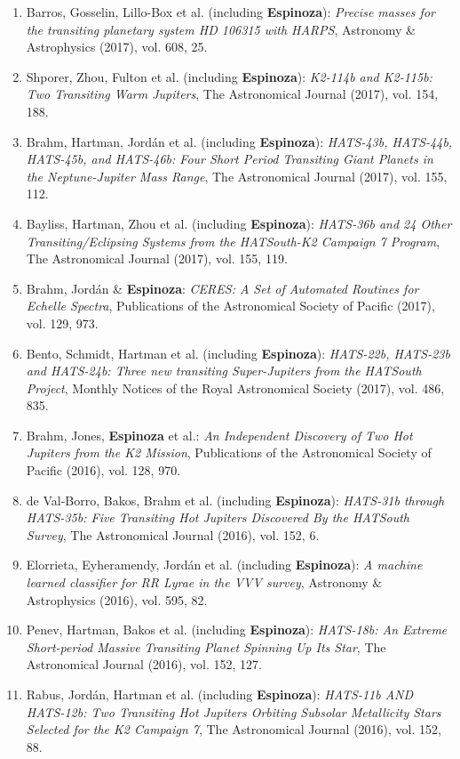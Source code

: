 \documentclass[11pt, a4paper]{article} %
\begin{document}
\begin{flushleft}
\begin{enumerate}
\item Barros, Gosselin, Lillo-Box et al. (including \textbf{Espinoza}): \textit{Precise masses for the transiting planetary system HD 106315 with HARPS}, Astronomy \& Astrophysics (2017), vol. 608, 25.
\item Shporer, Zhou, Fulton et al. (including \textbf{Espinoza}): \textit{K2-114b and K2-115b: Two Transiting Warm Jupiters}, The Astronomical Journal (2017), vol. 154, 188.
\item Brahm, Hartman, Jord\'an et al. (including \textbf{Espinoza}): \textit{HATS-43b, HATS-44b, HATS-45b, and HATS-46b: Four Short Period Transiting Giant Planets in the Neptune-Jupiter Mass Range}, The Astronomical Journal (2017), vol. 155, 112.
\item Bayliss, Hartman, Zhou et al. (including \textbf{Espinoza}): \textit{HATS-36b and 24 Other Transiting/Eclipsing Systems from the HATSouth-K2 Campaign 7 Program}, The Astronomical Journal (2017), vol. 155, 119.
\item Brahm, Jord\'an \& \textbf{Espinoza}: \textit{CERES: A Set of Automated Routines for Echelle Spectra}, Publications of the 
Astronomical Society of Pacific (2017), vol. 129, 973.
\item Bento, Schmidt, Hartman et al. (including \textbf{Espinoza}): \textit{HATS-22b, HATS-23b and HATS-24b: Three new transiting Super-Jupiters from the HATSouth Project}, Monthly Notices of the Royal Astronomical Society (2017), vol. 486, 835.
\item Brahm, Jones, \textbf{Espinoza} et al.: \textit{An Independent Discovery of Two Hot Jupiters from the K2 Mission}, 
Publications of the Astronomical Society of Pacific (2016), vol. 128, 970.
\item de Val-Borro, Bakos, Brahm et al. (including \textbf{Espinoza}): \textit{HATS-31b through HATS-35b: Five Transiting Hot Jupiters Discovered By the HATSouth Survey}, The Astronomical Journal (2016), vol. 152, 6.
\item Elorrieta, Eyheramendy, Jord\'an et al. (including \textbf{Espinoza}): \textit{A machine learned classifier for RR Lyrae in the 
VVV survey}, Astronomy \& Astrophysics (2016), vol. 595, 82.
\item Penev, Hartman, Bakos et al. (including \textbf{Espinoza}): \textit{HATS-18b: An Extreme Short-period Massive Transiting Planet Spinning Up Its Star}, The Astronomical Journal (2016), vol. 152, 127.
\item Rabus, Jord\'an, Hartman et al. (including \textbf{Espinoza}): \textit{HATS-11b AND HATS-12b: Two Transiting Hot Jupiters Orbiting Subsolar Metallicity Stars Selected for the K2 Campaign 7}, The Astronomical Journal (2016), vol. 152, 88.

\end{enumerate}
\end{flushleft}
\end{document}
